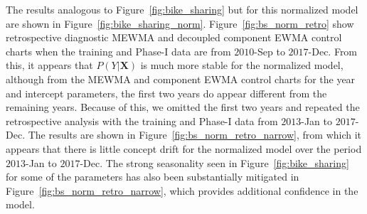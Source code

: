 \documentclass[twoside,11pt]{article}
\begin{document}

The results analogous to Figure~\ref{fig:bike_sharing} but for this normalized model are shown in Figure~\ref{fig:bike_sharing_norm}. Figure~\ref{fig:bs_norm_retro} show retrospective diagnostic MEWMA and decoupled component EWMA control charts when the training and Phase-I data are from $2010$-Sep to $2017$-Dec. From this, it appears that $P(Y|\bm{X})$ is much more stable for the normalized model, although from the MEWMA and component EWMA control charts for the year and intercept parameters, the first two years do appear different from the remaining years. Because of this, we omitted the first two years and repeated the retrospective analysis with the training and Phase-I data from $2013$-Jan to $2017$-Dec. The results are shown in Figure~\ref{fig:bs_norm_retro_narrow}, from which it appears that there is little concept drift for the normalized model over the period $2013$-Jan to $2017$-Dec. The strong seasonality seen in Figure~\ref{fig:bike_sharing} for some of the parameters has also been substantially mitigated in Figure~\ref{fig:bs_norm_retro_narrow}, which provides additional confidence in the model.
\end{document}
